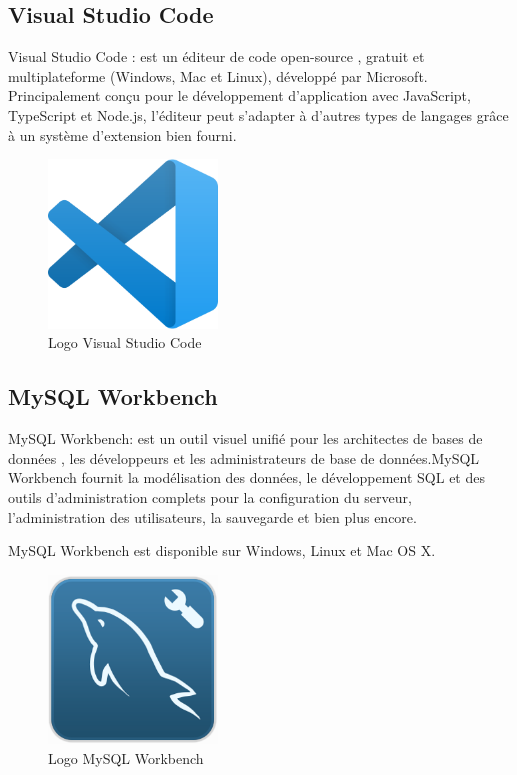 \documentclass[a4paper,10pt]{book}
\begin{document}
\subsection{ Visual Studio Code }
 Visual Studio Code : est un éditeur de code open-source \cite{vsc}, gratuit et multiplateforme (Windows, Mac et Linux), développé par Microsoft. Principalement conçu pour le développement d'application avec JavaScript, TypeScript et Node.js, l'éditeur peut s'adapter à d'autres types de langages grâce à un système d'extension bien fourni. 
\begin{figure}[!h]
\centering 
\includegraphics[width=0.4\textwidth]{vsc.png}
\caption{Logo Visual Studio Code }
\end{figure}
\subsection{MySQL Workbench }
   MySQL Workbench: est un outil visuel unifié pour les architectes de bases de données \cite{wb}, les développeurs et les administrateurs de base de données.MySQL Workbench fournit la modélisation des données, le développement SQL et des outils d'administration complets pour la configuration du serveur, l'administration des utilisateurs, la sauvegarde et bien plus encore.

     MySQL Workbench est disponible sur Windows, Linux et Mac OS X. 
 \begin{figure}[!h]
\centering 
\includegraphics[width=0.4\textwidth]{raw.png}
\caption{Logo MySQL Workbench }
\end{figure}
\end{document}
